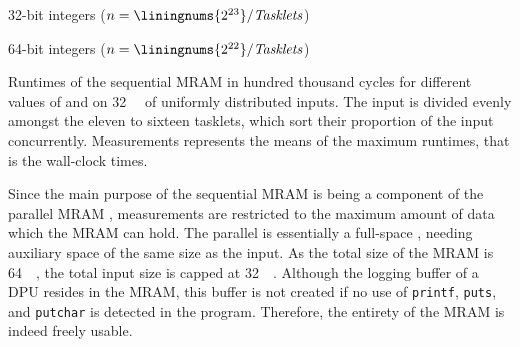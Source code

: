 \begin{table}[t]
	\centering
	\begin{subtable}{0.49\textwidth}
		\centering
		\pgfplotstabletypeset{\tableMergeMramXxxii}
		\caption{
			32-bit integers (\(n = \text{\liningnums{2\textsuperscript{23}}} / \mathit{Tasklets}\))
		}
	\end{subtable}
	\hfil
	\begin{subtable}{0.49\textwidth}
		\centering
		\pgfplotstabletypeset{\tableMergeMramLxiv}
		\caption{
			64-bit integers (\(n = \text{\liningnums{2\textsuperscript{22}}} / \mathit{Tasklets}\))
		}
	\end{subtable}

	\caption{
		Runtimes of the sequential \ac{MRAM} \MS{} in hundred thousand cycles for different values of \cachesize{} and \seqreadcachesize{} on \qty[exponent-mode=input]{32}{\mebi\byte} of uniformly distributed inputs.
		The input is divided evenly amongst the eleven to sixteen tasklets, which sort their proportion of the input concurrently.
		Measurements represents the means of the maximum runtimes, that is the wall-clock times.
	}
	\label{tab:mram:sizes}
\end{table}

Since the main purpose of the sequential \ac{MRAM} \MS{} is being a component of the parallel \ac{MRAM} \MS{}, measurements are restricted to the maximum amount of data which the \ac{MRAM} can hold.
The parallel \MS{} is essentially a full-space \MS{}, needing auxiliary space of the same size as the input.
As the total size of the \ac{MRAM} is \qty{64}{\mebi\byte}, the total input size is capped at \qty{32}{\mebi\byte}.
Although the logging buffer of a \ac{DPU} resides in the \ac{MRAM}, this buffer is not created if no use of \lstinline|printf|, \lstinline|puts|, and \lstinline|putchar| is detected in the program.
Therefore, the entirety of the \ac{MRAM} is indeed freely usable.

